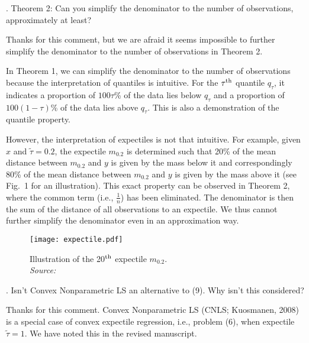 \documentclass[12pt]{article}
\newcommand{\np}{\vskip 0.3cm}
\begin{document}
 
 \np
 \np
 \np
\begin{sf}
{. Theorem 2: Can you simplify the denominator to the number of observations, approximately at least?}
\end{sf}
\begin{response}
Thanks for this comment, but we are afraid it seems impossible to further simplify the denominator to the number of observations in Theorem 2. \np

In Theorem 1, we can simplify the denominator to the number of observations because the interpretation of quantiles is intuitive. For the $\tau\textsuperscript{th}$ quantile $q_\tau$, it indicates a proportion of $100\tau$\% of the data lies below $q_{\tau}$ and a proportion of $100(1-\tau)$\% of the data lies above $q_{\tau}$. This is also a demonstration of the quantile property. \np

However, the interpretation of expectiles is not that intuitive. For example, given $x$ and $\tilde{\tau}=0.2$, the expectile $m_{0.2}$ is determined such that 20\% of the mean distance between $m_{0.2}$ and $y$ is given by the mass below it and correspondingly 80\% of the mean distance between $m_{0.2}$ and $y$ is given by the mass above it (see Fig.~1 for an illustration). This exact property can be observed in Theorem 2, where the common term (i.e., $\frac{1}{n}$) has been eliminated. The denominator is then the sum of the distance of all observations to an expectile. We thus cannot further simplify the denominator even in an approximation way.
\begin{figure}[H]
    \centering
    \texttt{[image: expectile.pdf]}
    \caption{Illustration of the 20$\textsuperscript{th}$ expectile $m_{0.2}$.\\
    \textit{Source:~\protect{} \protect\citeyear{SchulzeWaltrup2014}}}
\end{figure}

\end{response}

 
 \np
 \np
 \np
\begin{sf}
{. Isn't Convex Nonparametric LS an alternative to (9). Why isn't this considered?}
\end{sf}
\begin{response}
Thanks for this comment. Convex Nonparametric LS (CNLS; Kuosmanen, 2008) is a special case of convex expectile regression, i.e., problem (6), when expectile $\tilde{\tau}=1$. We have noted this in the revised manuscript.\np

\end{response}
\end{document}
